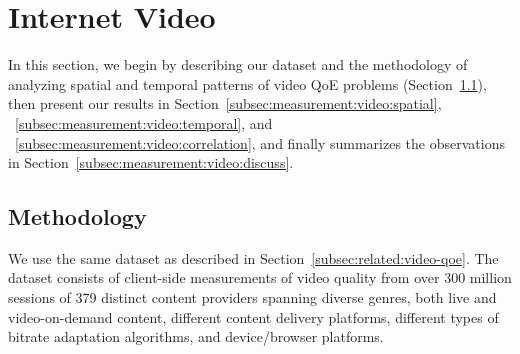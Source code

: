 
\section{Internet Video}
\label{sec:measurement:video} 

\newcommand{\numsessions}{numsessions\xspace}
\newcommand{\problemsession}{problem session\xspace}
\newcommand{\problemsessions}{problem sessions\xspace}
\newcommand{\cluster}{cluster\xspace}
\newcommand{\clusters}{clusters\xspace}
\newcommand{\problemcluster}{problem cluster\xspace}
\newcommand{\problemclusters}{problem clusters\xspace}
\newcommand{\problemratio}{problem ratio\xspace}

\newcommand{\criticalcluster}{critical cluster\xspace}
\newcommand{\criticalclusters}{critical clusters\xspace}

In this section, we begin by describing our dataset and
the methodology of analyzing spatial and temporal patterns
of video QoE problems 
(Section~\ref{subsec:measurement:video:method}),
then present our results in 
Section~\ref{subsec:measurement:video:spatial},
~\ref{subsec:measurement:video:temporal}, and
~\ref{subsec:measurement:video:correlation},
and finally summarizes the observations in 
Section~\ref{subsec:measurement:video:discuss}.

\subsection{Methodology}
\label{subsec:measurement:video:method}

We use the same dataset as described in 
Section~\ref{subsec:related:video-qoe}. 
The dataset consists of client-side measurements of
video  quality from over 300 million sessions of 
379 distinct content providers spanning diverse
genres, both live and video-on-demand content, different
content delivery platforms, different types of  bitrate adaptation
algorithms, and device/browser platforms.

